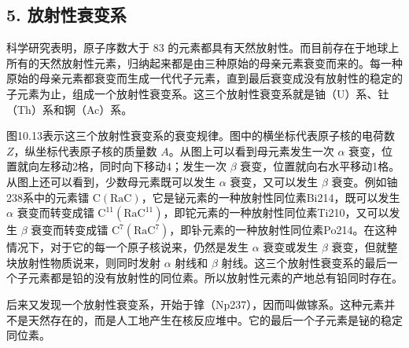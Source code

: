 \subsection{5. 放射性衰变系}

科学研究表明，原子序数大于 83
的元素都具有天然放射性。而目前存在于地球上所有的天然放射性元素，归纳起来都是由三种原始的母亲元素衰变而来的。每一种原始的母亲元素都衰变而生成一代代子元素，直到最后衰变成没有放射性的稳定的子元素为止，组成一个放射性衰变系。这三个放射性衰变系就是铀（U）系、钍（Th）系和锕（Ac）系。

图10.13表示这三个放射性衰变系的衰变规律。图中的横坐标代表原子核的电荷数
\(Z\)，纵坐标代表原子核的质量数 \(A\)。从图上可以看到母元素发生一次
\(\alpha\) 衰变，位置就向左移动2格，同时向下移动4；发生一次 \(\beta\)
衰变，位置就向右水平移动1格。从图上还可以看到，少数母元素既可以发生
\(\alpha\) 衰变，又可以发生 \(\beta\) 衰变。例如铀238系中的元素镭
\(\mathrm{C(RaC)}\)，它是铋元素的一种放射性同位素Bi214，既可以发生
\(\alpha\) 衰变而转变成镭
\(\mathrm{C}^{11}(\mathrm{RaC}^{11})\)，即铊元素的一种放射性同位素Ti210，又可以发生
\(\beta\) 衰变而转变成镭
\(\mathrm{C}^{7}(\mathrm{RaC}^{7})\)，即钋元素的一种放射性同位素Po214。在这种情况下，对于它的每一个原子核说来，仍然是发生
\(\alpha\) 衰变或发生 \(\beta\) 衰变，但就整块放射性物质说来，则同时发射
\(\alpha\) 射线和 \(\beta\)
射线。这三个放射性衰变系的最后一个子元素都是铅的没有放射性的同位素。所以放射性元素的产地总有铅同时存在。

后来又发现一个放射性衰变系，开始于镎（Np237），因而叫做镓系。这种元素并不是天然存在的，而是人工地产生在核反应堆中。它的最后一个子元素是铋的稳定同位素。

